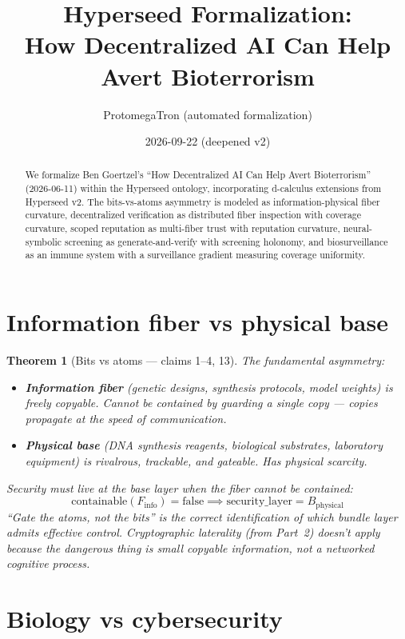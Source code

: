 \documentclass[11pt,a4paper]{article}
\title{Hyperseed Formalization:\\
  How Decentralized AI Can Help Avert Bioterrorism}
\author{ProtomegaTron (automated formalization)}
\date{2026-09-22 (deepened v2)}
\newtheorem{theorem}[definition]{Theorem}
\begin{document}
\maketitle

\begin{abstract}
We formalize Ben Goertzel's ``How Decentralized AI Can Help Avert
Bioterrorism'' (2026-06-11) within the Hyperseed ontology, incorporating
d-calculus extensions from Hyperseed v2. The bits-vs-atoms asymmetry
is modeled as information-physical fiber curvature, decentralized
verification as distributed fiber inspection with coverage curvature,
scoped reputation as multi-fiber trust with reputation curvature,
neural-symbolic screening as generate-and-verify with screening
holonomy, and biosurveillance as an immune system with a surveillance
gradient measuring coverage uniformity.
\end{abstract}

\tableofcontents

\section{Information fiber vs physical base}

\begin{theorem}[Bits vs atoms --- claims 1--4, 13]
\label{thm:bits_atoms}
The fundamental asymmetry:
\begin{itemize}
  \item \textbf{Information fiber} (genetic designs, synthesis protocols,
    model weights) is freely copyable. Cannot be contained by guarding
    a single copy --- copies propagate at the speed of communication.
  \item \textbf{Physical base} (DNA synthesis reagents, biological
    substrates, laboratory equipment) is rivalrous, trackable, and
    gateable. Has physical scarcity.
\end{itemize}

Security must live at the base layer when the fiber cannot be contained:
\[
  \text{containable}(F_{\text{info}}) = \text{false} \implies
    \text{security\_layer} = B_{\text{physical}}
\]
``Gate the atoms, not the bits'' is the correct identification of which
bundle layer admits effective control. Cryptographic laterality (from
Part~2) doesn't apply because the dangerous thing is small copyable
information, not a networked cognitive process.
\end{theorem}

\section{Biology vs cybersecurity}
\end{document}
